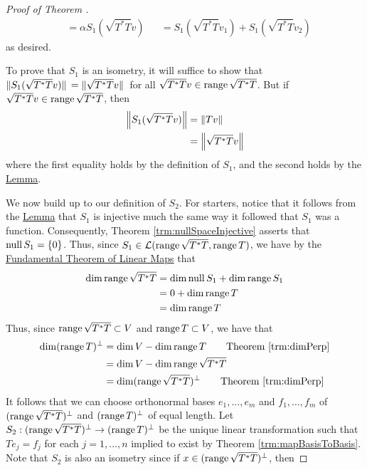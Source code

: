\documentclass[../main.tex]{subfiles}
\begin{document}
\begin{itemize}
\begin{theorem}
\begin{proof}[Proof of Theorem {\hyperref[trm:polarDecomp]{7.21}}]
\begin{align*}
                &= \alpha S_1(\sqrt{T^*T}v)&
                    &= S_1(\sqrt{T^*T}v_1)+S_1(\sqrt{T^*T}v_2)
            \end{align*}
            as desired.\par
            To prove that $S_1$ is an isometry, it will suffice to show that $\norm*{S_1(\sqrt{T^*T}v)}=\norm*{\sqrt{T^*T}v}$ for all $\sqrt{T^*T}v\in\operatorname{range}\sqrt{T^*T}$. But if $\sqrt{T^*T}v\in\operatorname{range}\sqrt{T^*T}$, then
            \begin{align*}
                \norm{S_1(\sqrt{T^*T}v)} &= \norm{Tv}\\
                &= \norm{\sqrt{T^*T}v}
            \end{align*}
            where the first equality holds by the definition of $S_1$, and the second holds by the \hyperref[lem:normTroot]{Lemma}.\par\smallskip
            We now build up to our definition of $S_2$. For starters, notice that it follows from the \hyperref[lem:normTroot]{Lemma} that $S_1$ is injective much the same way it followed that $S_1$ was a function. Consequently, Theorem \ref{trm:nullSpaceInjective} asserts that $\operatorname{null} S_1=\{0\}$. Thus, since $S_1\in\mathcal{L}(\operatorname{range}\sqrt{T^*T},\operatorname{range} T)$, we have by the \hyperref[trm:fundamentalTheoremLinearMaps]{Fundamental Theorem of Linear Maps} that
            \begin{align*}
                \dim\operatorname{range}\sqrt{T^*T} &= \dim\operatorname{null} S_1+\dim\operatorname{range} S_1\\
                &= 0+\dim\operatorname{range} T\\
                &= \dim\operatorname{range} T
            \end{align*}
            Thus, since $\operatorname{range}\sqrt{T^*T}\subset V$ and $\operatorname{range} T\subset V$, we have that
            \begin{align*}
                \dim(\range T)^\perp &= \dim V-\dim\range T\tag*{Theorem \ref{trm:dimPerp}}\\
                &= \dim V-\dim\range\sqrt{T^*T}\\
                &= \dim(\range\sqrt{T^*T})^\perp\tag*{Theorem \ref{trm:dimPerp}}
            \end{align*}
            It follows that we can choose orthonormal bases $e_1,\dots,e_m$ and $f_1,\dots,f_m$ of $(\operatorname{range}\sqrt{T^*T})^\perp$ and $(\operatorname{range} T)^\perp$ of equal length. Let $S_2:(\operatorname{range}\sqrt{T^*T})^\perp\to(\operatorname{range} T)^\perp$ be the unique linear transformation such that $Te_j=f_j$ for each $j=1,\dots,n$ implied to exist by Theorem \ref{trm:mapBasisToBasis}. Note that $S_2$ is also an isometry since if $x\in(\operatorname{range}\sqrt{T^*T})^\perp$, then

\end{proof}
\end{theorem}
\end{itemize}
\end{document}
